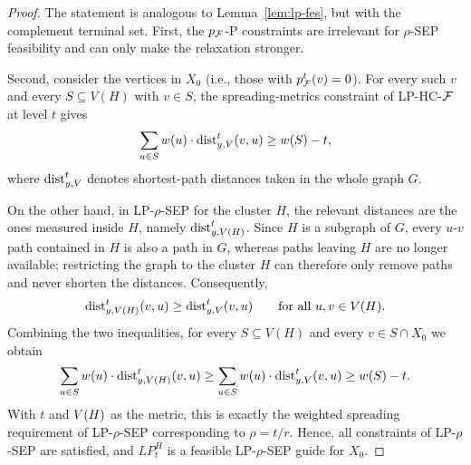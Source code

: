     \begin{proof}
        The statement is analogous to Lemma~\ref{lem:lp-fes}, but with the complement terminal set.
        First, the $p_{\mathcal{F}}$-P constraints are irrelevant for \textsc{$\rho$-SEP} feasibility and can only make the relaxation stronger.

        Second, consider the vertices in $X_0$ (i.e., those with $p_{\mathcal{F}}^t(v)=0$). For every such $v$ and every $S\subseteq V(H)$ with $v\in S$, the spreading-metrics constraint of \textsc{LP-HC-$\mathcal{F}$} at level $t$ gives
        \[
            \sum_{u\in S} w(u)\cdot \text{dist}_{y,V}^{t}(v,u) \geq w\mathopen{}\left( S \right)-t,
        \]
        where $\text{dist}_{y,V}^{t}$ denotes shortest-path distances taken in the whole graph $G$.

        On the other hand, in \textsc{LP-$\rho$-SEP} for the cluster $H$, the relevant distances are the ones measured inside $H$, namely $\text{dist}_{y,V(H)}^{t}$. Since $H$ is a subgraph of $G$, every $u$-$v$ path contained in $H$ is also a path in $G$, whereas paths leaving $H$ are no longer available; restricting the graph to the cluster $H$ can therefore only remove paths and never shorten the distances. Consequently,
        \[
            \text{dist}_{y,V(H)}^{t}(v,u) \geq \text{dist}_{y,V}^{t}(v,u) \qquad \text{for all } u,v\in V(H).
        \]
        Combining the two inequalities, for every $S\subseteq V(H)$ and every $v\in S\cap X_0$ we obtain
        \[
            \sum_{u\in S} w(u)\cdot \text{dist}_{y,V(H)}^{t}(v,u) \geq \sum_{u\in S} w(u)\cdot \text{dist}_{y,V}^{t}(v,u) \geq w\mathopen{}\left( S \right)-t.
        \]
        With $t$ and $V\mathopen{}\left( H \right)$ as the metric, this is exactly the weighted spreading requirement of \textsc{LP-$\rho$-SEP} corresponding to $\rho=t/r$. Hence, all constraints of \textsc{LP-$\rho$-SEP} are satisfied, and $LP_t^H$ is a feasible \textsc{LP-$\rho$-SEP} guide for $X_0$.
    \end{proof}
